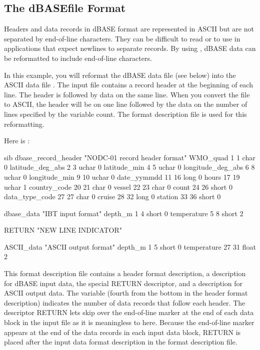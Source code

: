 \subsection{The dBASEfile Format}

Headers and data records in dBASE format are represented in ASCII but
are not separated by end-of-line characters. They can be difficult to
read or to use in applications that expect newlines to separate
records. By using , dBASE data can be reformatted to
include end-of-line characters.

In this example, you will reformat the dBASE data file
 (see below) into the ASCII data file
. The input file  contains a
record header at the beginning of each line. The header is followed by
data on the same line. When you convert the file to ASCII, the header
will be on one line followed by the data on the number of lines
specified by the variable count. The format description file
 is used for this reformatting.

Here is :

\begin{vcode}{sib}
dbase_record_header "NODC-01 record header format"
WMO_quad 1 1 char 0
latitude_deg_abs 2 3 uchar 0
latitude_min 4 5 uchar 0
longitude_deg_abs 6 8 uchar 0
longitude_min 9 10 uchar 0
date_yymmdd 11 16 long 0
hours 17 19 uchar 1
country_code 20 21 char 0
vessel 22 23 char 0
count 24 26 short 0
data_type_code 27 27 char 0
cruise 28 32 long 0
station 33 36 short 0

dbase_data "IBT input format"
depth_m 1 4 short 0
temperature 5 8 short 2

RETURN "NEW LINE INDICATOR"

ASCII_data "ASCII output format"
depth_m 1 5 short 0
temperature 27 31 float 2 
\end{vcode}

This format description file contains a header format description, a
description for dBASE input data, the special RETURN descriptor, and a
description for ASCII output data. The variable  (fourth
from the bottom in the header format description) indicates the number
of data records that follow each header. The descriptor RETURN lets
 skip over the end-of-line marker at the end of each data
block in the input file  as it is meaningless to
 here. Because the end-of-line marker appears at the end
of the data records in each input data block, RETURN is placed after
the input data format description in the format description file.

